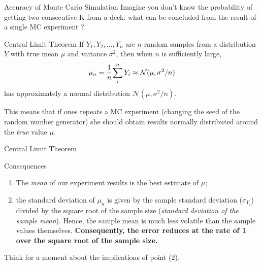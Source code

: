 \documentclass{beamer}
\begin{document}
\begin{frame}{Accuracy of Monte Carlo Simulation}
Imagine you don't know the probability of getting two consecutive K from a deck: what can be concluded from the result of a single MC experiment ?
\begin{block}{Central Limit Theorem}    
If $Y_1, Y_2,\dots, Y_n$ are $n$ random samples from a distribution $Y$ with true mean $\mu$ and variance $\sigma^{2}$, then when $n$ is sufficiently large, 
\begin{equation*}
\mu_n = \cfrac{1}{n}\sum_i^n Y_i \approx \mathcal{N}(\mu, \sigma^2/n)
\end{equation*}
has approximately a normal distribution $\mathcal{N}(\mu, \sigma^2/n)$. 

This means that if ones repeats a MC experiment (changing the seed of the random number generator) she should obtain results normally distributed around the \emph{true} value $\mu$.
\end{block}
\href{https://colab.research.google.com/drive/1cQbX7jWk4_pfrm72r3ZiZyDEpevP63z2?authuser=1\#scrollTo=0ef8c284\&line=7\&uniqifier=1}{}
\end{frame}

\begin{frame}{Central Limit Theorem}
\begin{block}{Consequences}
\begin{enumerate}
	\item The \emph{mean} of our experiment results is the best estimate of $\mu$;
	\item the standard deviation of $\mu_n$ is given by the sample standard deviation ($\sigma_{Y_i}$) divided by the square root of the sample size (\emph{standard deviation of the sample mean}). Hence, the sample mean is much less volatile than the sample values themselves.\textbf{ Consequently, the error reduces at the rate of 1 over the square root of the sample size.} 
\end{enumerate}
\end{block}
\vspace{0.5 cm}
Think for a moment about the implications of point (2).
\end{frame}
\end{document}
